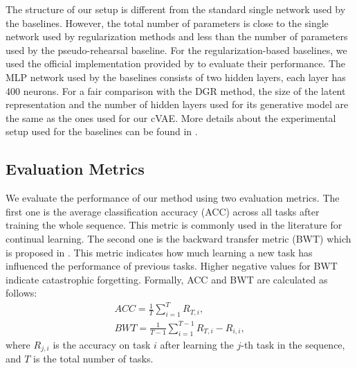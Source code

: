 \documentclass[letterpaper]{article} %
\begin{document}
The structure of our setup is different from the standard single network used by the baselines. However, the total number of parameters is close to the single network used by regularization methods and less than the number of parameters used by the pseudo-rehearsal baseline. For the regularization-based baselines, we used the official implementation provided by \cite{VanDeVen2018a} to evaluate their performance. The MLP network used by the baselines consists of two hidden layers, each layer has 400 neurons. For a fair comparison with the DGR method, the size of the latent representation and the number of hidden layers used for its generative model are the same as the ones used for our cVAE. More details about the experimental setup used for the baselines can be found in \cite{VanDeVen2018a}.

\subsection{Evaluation Metrics}
We evaluate the performance of our method using two evaluation metrics. The first one is the average classification accuracy (ACC) across all tasks after training the whole sequence. This metric is commonly used in the literature for continual learning. The second one is the backward transfer metric (BWT) which is proposed in \cite{lopez2017gradient}. This metric indicates how much learning a new task has influenced the performance of previous tasks. Higher negative values for BWT indicate catastrophic forgetting. Formally, ACC and BWT are calculated as follows:
\begin{equation}
\label{ACC_BWT}
\begin{split}
   ACC = \frac{1}{T} \sum_{i=1}^{T} R_{T,i}, \\
   BWT = \frac{1}{T-1} \sum_{i=1}^{T-1} R_{T,i} - R_{i,i},
\end{split}
\end{equation}
where $R_{j,i}$ is the accuracy on task ${i}$ after learning
the $j$-th task in the sequence, and $T$ is the total number of tasks.
\end{document}
